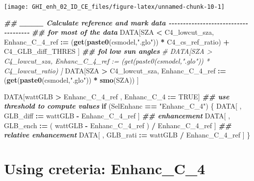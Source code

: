 \documentclass[
  10pt,
  a4paper,oneside]{article}
\newenvironment{Shaded}{\begin{snugshade}}{\end{snugshade}}
\newcommand{\CommentTok}[1]{\textcolor[rgb]{0.56,0.35,0.01}{\textit{#1}}}
\newcommand{\ConstantTok}[1]{\textcolor[rgb]{0.56,0.35,0.01}{#1}}
\newcommand{\ControlFlowTok}[1]{\textcolor[rgb]{0.13,0.29,0.53}{\textbf{#1}}}
\newcommand{\DocumentationTok}[1]{\textcolor[rgb]{0.56,0.35,0.01}{\textbf{\textit{#1}}}}
\newcommand{\FunctionTok}[1]{\textcolor[rgb]{0.13,0.29,0.53}{\textbf{#1}}}
\newcommand{\NormalTok}[1]{#1}
\newcommand{\SpecialCharTok}[1]{\textcolor[rgb]{0.81,0.36,0.00}{\textbf{#1}}}
\newcommand{\StringTok}[1]{\textcolor[rgb]{0.31,0.60,0.02}{#1}}
\begin{document}
\begin{center}\texttt{[image: GHI\_enh\_02\_ID\_CE\_files/figure-latex/unnamed-chunk-10-1]} \end{center}

\begin{Shaded}
\begin{Highlighting}[]
\DocumentationTok{\#\# \_\_\_\_ Calculate reference and mark data  {-}{-}{-}{-}{-}{-}{-}{-}{-}{-}{-}{-}{-}{-}{-}{-}{-}{-}{-}{-}{-}{-}{-}{-}{-}{-}{-}{-}{-}{-}{-}{-}{-}{-}{-}{-}{-}}
\DocumentationTok{\#\# for most of the data}
\NormalTok{DATA[SZA }\SpecialCharTok{\textless{}}\NormalTok{ C4\_lowcut\_sza, Enhanc\_C\_4\_ref }\SpecialCharTok{:=}\NormalTok{ (}\FunctionTok{get}\NormalTok{(}\FunctionTok{paste0}\NormalTok{(csmodel,}\StringTok{".glo"}\NormalTok{)) }\SpecialCharTok{*}\NormalTok{ C4\_cs\_ref\_ratio) }\SpecialCharTok{+}\NormalTok{ C4\_GLB\_diff\_THRES ]}
\DocumentationTok{\#\# fol low sun angles}
\CommentTok{\# DATA[SZA \textgreater{} C4\_lowcut\_sza, Enhanc\_C\_4\_ref := (get(paste0(csmodel,".glo")) * C4\_lowcut\_ratio) ]}
\NormalTok{DATA[SZA }\SpecialCharTok{\textgreater{}}\NormalTok{ C4\_lowcut\_sza, Enhanc\_C\_4\_ref }\SpecialCharTok{:=}\NormalTok{ (}\FunctionTok{get}\NormalTok{(}\FunctionTok{paste0}\NormalTok{(csmodel,}\StringTok{".glo"}\NormalTok{)) }\SpecialCharTok{*} \FunctionTok{smo}\NormalTok{(SZA)) ]}

\NormalTok{DATA[wattGLB }\SpecialCharTok{\textgreater{}}\NormalTok{ Enhanc\_C\_4\_ref ,}
\NormalTok{     Enhanc\_C\_4 }\SpecialCharTok{:=} \ConstantTok{TRUE}\NormalTok{]}
\DocumentationTok{\#\# use threshold to compute values}
\ControlFlowTok{if}\NormalTok{ (SelEnhanc }\SpecialCharTok{==} \StringTok{"Enhanc\_C\_4"}\NormalTok{) \{}
\NormalTok{    DATA[ , GLB\_diff }\SpecialCharTok{:=}\NormalTok{   wattGLB }\SpecialCharTok{{-}}\NormalTok{ Enhanc\_C\_4\_ref                    ] }\DocumentationTok{\#\# enhancement}
\NormalTok{    DATA[ , GLB\_ench }\SpecialCharTok{:=}\NormalTok{ ( wattGLB }\SpecialCharTok{{-}}\NormalTok{ Enhanc\_C\_4\_ref ) }\SpecialCharTok{/}\NormalTok{ Enhanc\_C\_4\_ref ] }\DocumentationTok{\#\# relative enhancement}
\NormalTok{    DATA[ , GLB\_rati }\SpecialCharTok{:=}\NormalTok{   wattGLB }\SpecialCharTok{/}\NormalTok{ Enhanc\_C\_4\_ref                    ]}
\NormalTok{\}}
\end{Highlighting}
\end{Shaded}

\FloatBarrier

\hypertarget{using-creteria-enhanc_c_4}{%
\section{Using creteria: Enhanc\_C\_4}\label{using-creteria-enhanc_c_4}}
\end{document}
